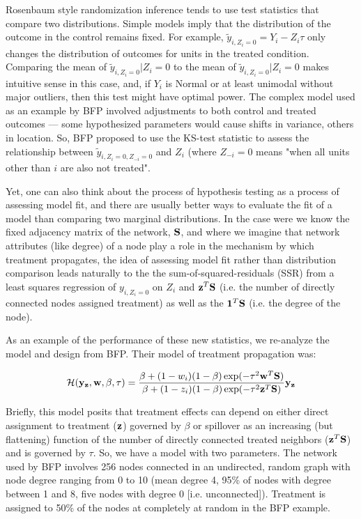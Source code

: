 Rosenbaum style randomization inference tends to use test statistics that
compare two distributions. Simple models imply that the distribution of the
outcome in the control remains fixed. For example, $\widetilde
y_{i,Z_i=0}=Y_i-Z_i \tau$ only changes the distribution of outcomes for units
in the treated condition. Comparing the mean of $\widetilde y_{i,Z_i=0}|Z_i=0$
to the mean of $\widetilde y_{i,Z_i=0}|Z_i=0$ makes intuitive sense in this
case, and, if $Y_i$ is Normal or at least unimodal without major outliers,
then this test might have optimal power. The complex model used as an example
by BFP involved adjustments to both control and treated outcomes --- some
hypothesized parameters would cause shifts in variance, others in location.
So, BFP proposed to use the KS-test statistic to assess the relationship
between $\widetilde y_{i,Z_i=0,Z_{-i}=0}$ and $Z_i$ (where $Z_{-i}=0$ means
"when all units other than $i$ are also not treated".

Yet, one can also think about the process of hypothesis testing as a process
of assessing model fit, and there are usually better ways to evaluate the fit
of a model than comparing two marginal distributions. In the case were we know
the fixed adjacency matrix of the network, $\mathbf{S}$, and where we imagine that
network attributes (like degree) of a node play a role in the mechanism by
which treatment propagates, the idea of assessing model fit rather than
distribution comparison leads naturally to the the sum-of-squared-residuals
(SSR) from a least squares regression of $ y_{i,Z_i=0}$ on $Z_{i}$ and
$\mathbf{z}^{T} \mathbf{S}$ (i.e. the number of directly connected nodes assigned treatment)
as well as the $\mathbf{1}^{T} \mathbf{S}$ (i.e. the degree of the node). 

As an example of the performance of these new statistics, we re-analyze the
model and design from BFP. Their model of treatment propagation
was:

\begin{equation}
\mathcal{H}(\mathbf{y}_{\mathbf{z}}, \mathbf{w}, \beta, \tau) =
 \frac{\beta + (1 - w_i) (1 - \beta) \exp(- \tau^2 \mathbf{w}^{T} \mathbf{S})}
      {\beta + (1 - z_i) (1 - \beta) \exp(- \tau^2 \mathbf{z}^{T} \mathbf{S})} \mathbf{y}_{\mathbf{z}}
\label{eq:spillovermodelA}
\end{equation}

Briefly, this model posits that treatment effects can depend on either direct
assignment to treatment ($\mathbf{z}$) governed by $\beta$ or spillover as an
increasing (but flattening) function of the number of directly connected
treated neighbors ($\mathbf{z}^{T} \mathbf{S}$) and is governed by $\tau$. So, we have a
model with two parameters. The network used by BFP involves 256 nodes
connected in an undirected, random graph with node degree ranging from 0 to 10
(mean degree 4, 95\% of nodes with degree between 1 and 8, five nodes with
degree 0 [i.e. unconnected]).  Treatment is assigned to 50\% of the nodes at
completely at random in the BFP example.

